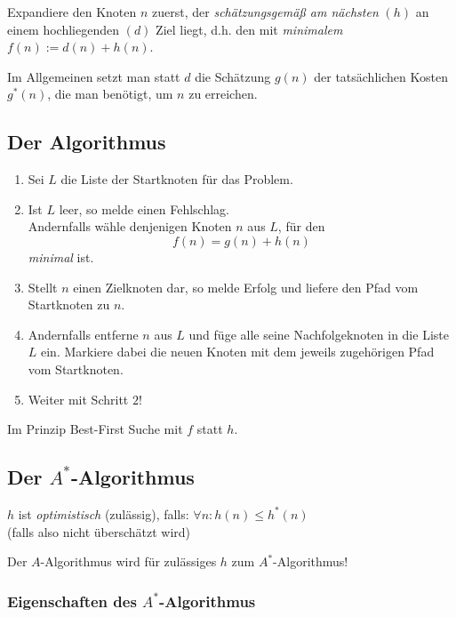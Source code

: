 \documentclass[runningheads,deutsch]{llncs}
\begin{document}
Expandiere den Knoten $n$ zuerst, der \textit{schätzungsgemäß am nächsten} $(h)$ an einem hochliegenden $(d)$ Ziel liegt, d.h. den mit \textit{minimalem} $f(n) := d(n) + h(n)$.

Im Allgemeinen setzt man statt $d$ die Schätzung $g(n)$ der tatsächlichen Kosten $g^*(n)$, die man benötigt, um $n$ zu erreichen.

\pagebreak

\subsection{Der Algorithmus}

\begin{enumerate}
    \item Sei $L$ die Liste der Startknoten für das Problem.
    \item Ist $L$ leer, so melde einen Fehlschlag. \\ Andernfalls wähle denjenigen Knoten $n$ aus $L$, für den \\
    \[ f(n) = g(n) + h(n) \]
    \textit{minimal} ist.
    \item Stellt $n$ einen Zielknoten dar, so melde Erfolg und liefere den Pfad vom Startknoten zu $n$.
    \item Andernfalls entferne $n$ aus $L$ und füge alle seine Nachfolgeknoten in die Liste $L$ ein. Markiere dabei die neuen Knoten mit dem jeweils zugehörigen Pfad vom Startknoten.
    \item Weiter mit Schritt $2$!
\end{enumerate}

Im Prinzip Best-First Suche mit $f$ statt $h$.

\subsection{Der $A^*$-Algorithmus}

$h$ ist \textit{optimistisch} (zulässig), falls: \qquad $\forall n: h(n) \leq h^*(n)$\\
(falls also nicht überschätzt wird)

\large Der $A$-Algorithmus wird für zulässiges $h$ zum $A^*$-Algorithmus!

\subsubsection{Eigenschaften des $A^*$-Algorithmus}
\end{document}
